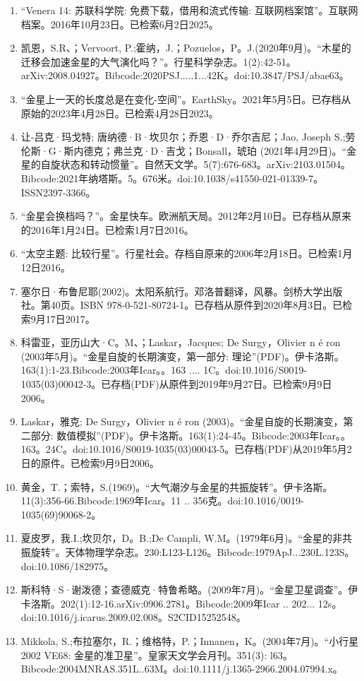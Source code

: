 \begin{enumerate}
\item “Venera 14: 苏联科学院: 免费下载，借用和流式传输: 互联网档案馆”。互联网档案。2016年10月23日。已检索6月2日2025。
\item 凯恩，S.R、；Vervoort, P.;霍纳，J.；Pozuelos，P。J.(2020年9月)。“木星的迁移会加速金星的大气演化吗？”。行星科学杂志。1(2):42-51。arXiv:2008.04927。Bibcode:2020PSJ.....1...42K。doi:10.3847/PSJ/abae63。
\item “金星上一天的长度总是在变化-空间”。EarthSky。2021年5月5日。已存档从原始的2023年4月28日。已检索4月28日2023。
\item 让-吕克·玛戈特; 唐纳德·B·坎贝尔；乔恩·D·乔尔吉尼；Jao, Joseph S.;劳伦斯·G·斯内德克；弗兰克·D·吉戈；Bonsall，琥珀 (2021年4月29日)。“金星的自旋状态和转动惯量”。自然天文学。5(7):676-683。arXiv:2103.01504。Bibcode:2021年纳塔斯。5。676米。doi:10.1038/s41550-021-01339-7。ISSN2397-3366。 
\item “金星会换档吗？”。金星快车。欧洲航天局。2012年2月10日。已存档从原来的2016年1月24日。已检索1月7日2016。
\item “太空主题: 比较行星”。行星社会。存档自原来的2006年2月18日。已检索1月12日2016。
\item 塞尔日·布鲁尼耶(2002)。太阳系航行。邓洛普翻译，风暴。剑桥大学出版社。第40页。ISBN 978-0-521-80724-1。已存档从原件到2020年8月3日。已检索9月17日2017。
\item 科雷亚，亚历山大·C。M、；Laskar，Jacques; De Surgy，Olivier n é ron (2003年5月)。“金星自旋的长期演变，第一部分: 理论”(PDF)。伊卡洛斯。163(1):1-23.Bibcode:2003年Icar。。163 .... 1C。doi:10.1016/S0019-1035(03)00042-3。已存档(PDF)从原件到2019年9月27日。已检索9月9日2006。
\item Laskar，雅克; De Surgy，Olivier n é ron (2003)。“金星自旋的长期演变，第二部分: 数值模拟”(PDF)。伊卡洛斯。163(1):24-45。Bibcode:2003年Icar。。163。24C。doi:10.1016/S0019-1035(03)00043-5。已存档(PDF)从2019年5月2日的原件。已检索9月9日2006。
\item 黄金，T.；索特，S.(1969)。“大气潮汐与金星的共振旋转”。伊卡洛斯。11(3):356-66.Bibcode:1969年Icar。11 .. 356克。doi:10.1016/0019-1035(69)90068-2。
\item 夏皮罗，我.I.;坎贝尔，D。B.;De Campli, W.M。(1979年6月)。“金星的非共振旋转”。天体物理学杂志。230:L123-L126。Bibcode:1979ApJ...230L.123S。doi:10.1086/182975。
\item 斯科特·S·谢泼德；查德威克·特鲁希略。(2009年7月)。“金星卫星调查”。伊卡洛斯。202(1):12-16.arXiv:0906.2781。Bibcode:2009年Icar .. 202... 12s。doi:10.1016/j.icarus.2009.02.008。S2CID15252548。 
\item Mikkola, S.;布拉塞尔，R.；维格特，P.；Innanen，K。(2004年7月)。“小行星2002 VE68: 金星的准卫星”。皇家天文学会月刊。351(3): l63。Bibcode:2004MNRAS.351L..63M。doi:10.1111/j.1365-2966.2004.07994.x。

\end{enumerate}
